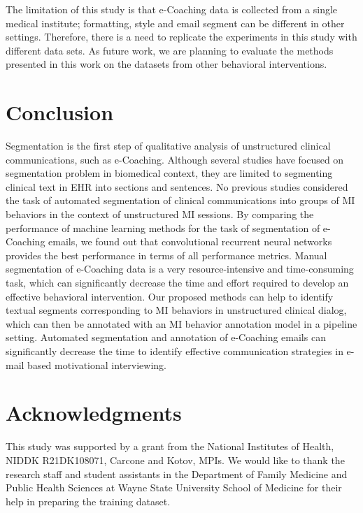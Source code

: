 \documentclass{amia}
\begin{document}
The limitation of this study is that e-Coaching data is collected from a single medical institute; formatting, style and email segment can be different in other settings. Therefore, there is a need to replicate the experiments in this study with different data sets. As future work, we are planning to evaluate the methods presented in this work on the datasets from other behavioral interventions. 
 
\section*{Conclusion}

Segmentation is the first step of qualitative analysis of unstructured clinical communications, such as e-Coaching. Although several studies have focused on segmentation problem in biomedical context, they are limited to segmenting clinical text in EHR into sections and sentences. No previous studies considered the task of automated segmentation of clinical communications into groups of MI behaviors in the context of unstructured MI sessions. By comparing the performance of machine learning methods for the task of segmentation of e-Coaching emails, we found out that convolutional recurrent neural networks provides the best performance in terms of all performance metrics. Manual segmentation of e-Coaching data is a very resource-intensive and time-consuming task, which can significantly decrease the time and effort required to develop an effective behavioral intervention. Our proposed methods can help to identify textual segments corresponding to MI behaviors in unstructured clinical dialog, which can then be annotated with an MI behavior annotation model in a pipeline setting. Automated segmentation and annotation of e-Coaching emails can significantly decrease the time to identify effective communication strategies in e-mail based motivational interviewing.

\section*{Acknowledgments}
This study was supported by a grant from the National Institutes of Health, NIDDK R21DK108071, Carcone and Kotov, MPIs. We would like to thank the research staff and student assistants in the Department of Family Medicine and Public Health Sciences at Wayne State University School of Medicine for their help in preparing the training dataset. 



\end{document}
